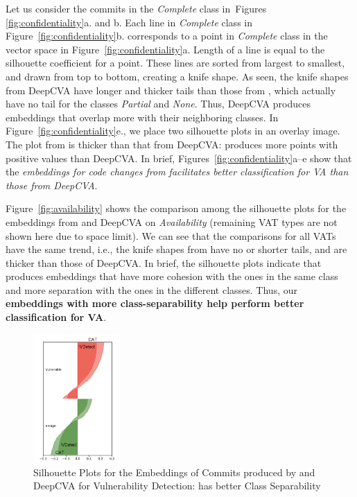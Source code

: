Let us consider the commits in the {\em Complete} class
in~Figures \ref{fig:confidentiality}a. and b. Each line in {\em
Complete} class in Figure~\ref{fig:confidentiality}b. corresponds to a
point in {\em Complete} class in the vector space in
Figure~\ref{fig:confidentiality}a. Length of a line is equal to
the silhouette coefficient for a point. These lines are
sorted from largest to smallest, and drawn from top to bottom, creating
a knife shape. As seen, the knife shapes from DeepCVA have longer and thicker
tails than those from {\tool}, which actually have no tail for the
classes {\em Partial} and {\em None}. 
Thus, DeepCVA produces
embeddings that overlap more with their neighboring classes.
In
Figure~\ref{fig:confidentiality}e., we place two silhouette plots in
an overlay image. The plot from {\tool} is thicker than that from
DeepCVA: {\tool} produces more points with positive values than
DeepCVA. In brief, Figures~\ref{fig:confidentiality}a--e show that the
{\em embeddings for code changes from {\tool} facilitates better
classification for VA than those from DeepCVA}.



Figure~\ref{fig:availability} shows the comparison among the
silhouette plots for the embeddings from {\tool} and DeepCVA on
{\em Availability} (remaining VAT types are not shown here due to space limit).
We can see that the comparisons for all VATs have the same trend, i.e., the knife
shapes from {\tool} have no or shorter tails, and are thicker than
those of DeepCVA. In brief, the silhouette plots indicate that {\tool} produces 
embeddings that have more cohesion with the ones in the same class and
more separation with the ones in the different classes. Thus, our {\bf
embeddings with more class-separability help {\tool} perform better
classification for VA}.



\begin{figure}[t]
	\centering
	\includegraphics[width=1.3in]{graphs/plot-vd}
       \vspace{-6pt}
	\caption{Silhouette Plots for the Embeddings of Commits produced by {\tool} and DeepCVA for Vulnerability Detection: {\tool} has better Class Separability}
	\label{fig:vd}
\end{figure}

